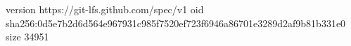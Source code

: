 version https://git-lfs.github.com/spec/v1
oid sha256:0d5e7b2d6d564e967931c985f7520ef723f6946a86701e3289d2af9b81b331e0
size 34951
